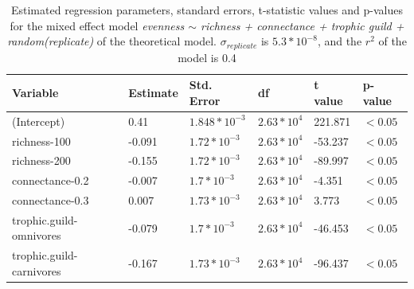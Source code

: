 \begin{table}[ht!]
\centering
\caption[Coefficients from evenness regression in simulated networks]{\color{Gray}Estimated regression parameters, standard errors, t-statistic values and p-values for the mixed effect model \textit{evenness $\sim$ richness + connectance + trophic guild + random(replicate)} of the theoretical model. $\sigma_{replicate}$ is $5.3*10^{-8}$, and the $r^2$ of the model is 0.4}\label{tab:tab4.1}
\begin{tabular}{llllll}
\hline
Variable & Estimate & Std. Error &         df & t value & p-value \\
\hline
(Intercept)            &  0.41 & $1.848*10^{-3}$ & $2.63*10^{4}$ & 221.871 & $<0.05$ \\
richness-100      & -0.091 & $1.72*10^{-3}$ &  $2.63*10^{4}$ & -53.237 & $<0.05$ \\
richness-200      & -0.155 & $1.72*10^{-3}$ &  $2.63*10^{4}$ & -89.997 & $<0.05$ \\
connectance-0.2   & -0.007 & $1.7*10^{-3}$ &  $2.63*10^{4}$ & -4.351 & $<0.05$ \\
connectance-0.3   &  0.007 & $1.73*10^{-3}$ &  $2.63*10^{4}$ & 3.773 & $<0.05$ \\
trophic.guild-omnivores & -0.079 & $1.7*10^{-3}$ & $2.63*10^{4}$ & -46.453 & $<0.05$ \\
trophic.guild-carnivores & -0.167 & $1.73*10^{-3}$ & $2.63*10^{4}$ & -96.437 & $<0.05$ \\
\hline
\end{tabular}

\end{table}

